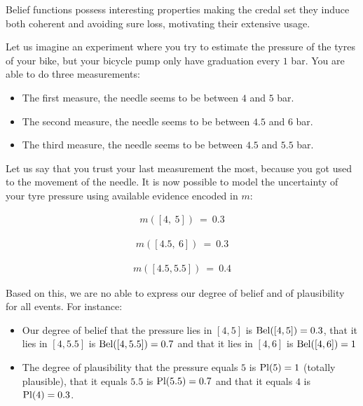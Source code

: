 Belief functions possess interesting properties making the credal set they induce both coherent and avoiding sure loss, motivating their extensive usage.

\begin{example}\label{ex:bicycle_pressure}
    Let us imagine an experiment where you try to estimate the pressure of the tyres of your bike, but your bicycle pump only have graduation every $1$ bar. You are able to do three measurements:
    \begin{itemize}
        \item The first measure, the needle seems to be between $4$ and $5$ bar.
        \item The second measure, the needle seems to be between $4.5$ and $6$ bar.
        \item The third measure, the needle seems to be between $4.5$ and $5.5$ bar.
    \end{itemize}
    Let us say that you trust your last measurement the most, because you got used to the movement of the needle. It is now possible to model the uncertainty of your tyre pressure using available evidence encoded in $m$:\\
    \noindent
    \begin{minipage}{0.3\textwidth}
        \begin{align*}
            m([4,~5]) ~=~ 0.3
        \end{align*}
    \end{minipage}\hfill
    \begin{minipage}{0.3\textwidth}
        \begin{align*}
            m([4.5,~6]) ~=~ 0.3
        \end{align*}
    \end{minipage}\hfill
    \begin{minipage}{0.3\textwidth}
        \begin{align*}
             m([4.5,5.5]) ~=~ 0.4
        \end{align*}
    \end{minipage}\par
    Based on this, we are no able to express our degree of belief and of plausibility for all events. For instance:
    \begin{itemize}
        \item Our degree of belief that the pressure lies in $[4, 5]$ is ${\mathrm{Bel}}([4, 5])=0.3$, that it lies in $[4, 5.5]$ is ${\mathrm{Bel}}([4, 5.5])=0.7$ and that it lies in $[4, 6]$ is ${\mathrm{Bel}}([4, 6])=1$
        \item The degree of plausibility that the pressure equals $5$ is ${\mathrm{Pl}} (5)=1$ (totally plausible), that it equals $5.5$ is ${\mathrm{Pl}} (5.5)=0.7$ and that it equals $4$ is ${\mathrm{Pl}} (4)=0.3$.
    \end{itemize}
\end{example}

